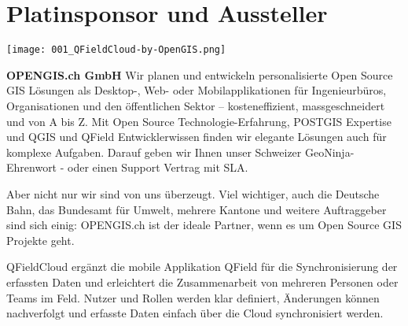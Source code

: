 \section*{Platinsponsor und Aussteller}
\begin{flushright}
\texttt{[image: 001\_QFieldCloud-by-OpenGIS.png]}
\end{flushright}
\noindent
    {\bfseries OPENGIS.ch GmbH} Wir planen und entwickeln personalisierte
    Open Source GIS Lösungen als Desktop-, Web- oder Mobilapplikationen für
    Ingenieurbüros, Organisationen und den öffentlichen Sektor – kosteneffizient,
    massgeschneidert und von A bis Z. Mit Open Source Technologie-Erfahrung,
    POSTGIS Expertise und QGIS und QField Entwicklerwissen finden wir elegante
    Lösungen auch für komplexe Aufgaben. Darauf geben wir Ihnen unser Schweizer
    GeoNinja-Ehrenwort - oder einen Support Vertrag mit SLA.

\noindent
Aber nicht nur wir sind von uns überzeugt. Viel wichtiger, auch die Deutsche Bahn,
das Bundesamt für Umwelt, mehrere Kantone und weitere Auftraggeber sind sich einig:
OPENGIS.ch ist der ideale Partner, wenn es um Open Source GIS Projekte geht.

\noindent
QFieldCloud ergänzt die mobile Applikation QField für die Synchronisierung der
erfassten Daten und erleichtert die Zusammenarbeit von mehreren Personen oder
Teams im Feld. Nutzer und Rollen werden klar definiert, Änderungen können
nachverfolgt und erfasste Daten einfach über die Cloud synchronisiert werden.

